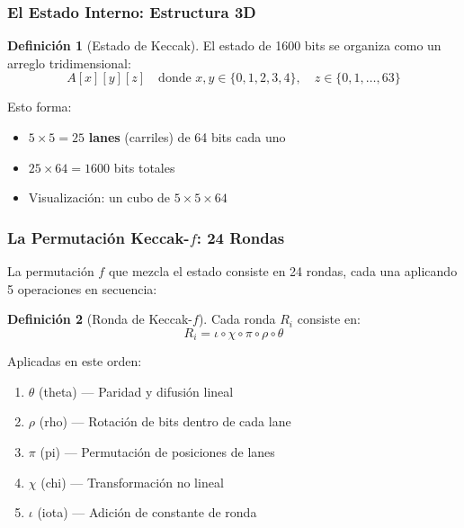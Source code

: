 \documentclass[11pt,a4paper,twoside,openright]{book}
\theoremstyle{definition}
\newtheorem{definition}{Definición}[chapter]
\theoremstyle{plain}
\theoremstyle{remark}
\begin{document}
\subsubsection{El Estado Interno: Estructura 3D}

\begin{definition}[Estado de Keccak]
El estado de 1600 bits se organiza como un arreglo tridimensional:
\[ A[x][y][z] \quad \text{donde } x, y \in \{0,1,2,3,4\}, \quad z \in \{0,1,\ldots,63\} \]

Esto forma:
\begin{itemize}
    \item $5 \times 5 = 25$ \textbf{lanes} (carriles) de 64 bits cada uno
    \item $25 \times 64 = 1600$ bits totales
    \item Visualización: un cubo de $5 \times 5 \times 64$
\end{itemize}
\end{definition}

\begin{center}
\end{center}

\subsubsection{La Permutación Keccak-$f$: 24 Rondas}

La permutación $f$ que mezcla el estado consiste en 24 rondas, cada una aplicando 5 operaciones en secuencia:

\begin{definition}[Ronda de Keccak-$f$]
Cada ronda $R_i$ consiste en:
\[ R_i = \iota \circ \chi \circ \pi \circ \rho \circ \theta \]

Aplicadas en este orden:
\begin{enumerate}
    \item $\theta$ (theta) --- Paridad y difusión lineal
    \item $\rho$ (rho) --- Rotación de bits dentro de cada lane
    \item $\pi$ (pi) --- Permutación de posiciones de lanes
    \item $\chi$ (chi) --- Transformación no lineal
    \item $\iota$ (iota) --- Adición de constante de ronda
\end{enumerate}
\end{definition}
\end{document}
